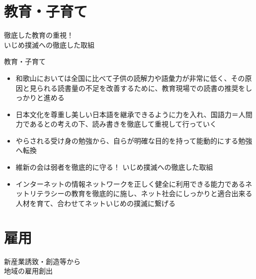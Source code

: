 \documentclass[dvipdfmx]{beamer}
\begin{document}
\section{教育・子育て}
    \begin{frame}{}{}
        \sectionpage
        \begin{center}
            \begin{large}
                \alert{徹底した教育の重視！}\\\alert{いじめ撲滅への徹底した取組}
            \end{large}
        \end{center}
    \end{frame}

    \begin{frame}{教育・子育て}{}
        \begin{small}
            \begin{itemize}
                \setlength{\parsep}{.5mm}
                \setlength{\itemsep}{2mm}
                \item 和歌山においては全国に比べて子供の読解力や語彙力が非常に低く、その原因と見られる読書量の不足を改善するために、教育現場での読書の推奨をしっかりと進める
                \item 日本文化を尊重し美しい日本語を継承できるように力を入れ、国語力＝人間力であるとの考えの下、読み書きを徹底して重視して行っていく
                \item やらされる受け身の勉強から、自らが明確な目的を持って能動的にする勉強へ転換
                \item 維新の会は弱者を徹底的に守る！ いじめ撲滅への徹底した取組
                \item インターネットの情報ネットワークを正しく健全に利用できる能力であるネットリテラシーの教育を徹底的に施し、ネット社会にしっかりと適合出来る人材を育て、合わせてネットいじめの撲滅に繋げる
            \end{itemize}
        \end{small}
    \end{frame}
    
\section{雇用}
    \begin{frame}{}{}
        \sectionpage
        \begin{center}
            \begin{large}
                \alert{新産業誘致・創造等から}\\\alert{地域の雇用創出}
            \end{large}
        \end{center}
    \end{frame}
\end{document}
